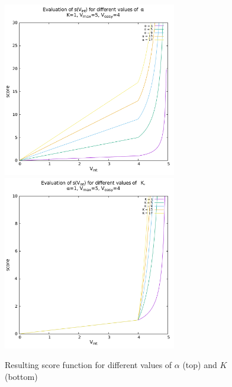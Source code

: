 \begin{figure}[htbp] \label{fig:score_function}
  \centering
  \includegraphics[height=3in]{./Graphics/score_alpha}
  \includegraphics[height=3in]{./Graphics/score_k}
  \caption{Resulting score function for different values of $\alpha$ (top) and
  $K$ (bottom)}
\end{figure}

